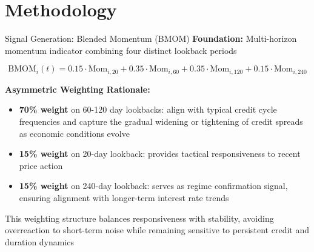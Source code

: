 \documentclass[aspectratio=169,10pt]{beamer}
\begin{document}
\section{Methodology}

\begin{frame}{Signal Generation: Blended Momentum (BMOM)}
\textbf{Foundation:} Multi-horizon momentum indicator combining four distinct lookback periods

\vspace{0.3cm}

$$\text{BMOM}_i(t) = 0.15 \cdot \text{Mom}_{i,20} + 0.35 \cdot \text{Mom}_{i,60} + 0.35 \cdot \text{Mom}_{i,120} + 0.15 \cdot \text{Mom}_{i,240}$$

\vspace{0.3cm}

\textbf{Asymmetric Weighting Rationale:}
\begin{itemize}
    \item \textbf{70\% weight} on 60-120 day lookbacks: align with typical credit cycle frequencies and capture the gradual widening or tightening of credit spreads as economic conditions evolve

    \item \textbf{15\% weight} on 20-day lookback: provides tactical responsiveness to recent price action

    \item \textbf{15\% weight} on 240-day lookback: serves as regime confirmation signal, ensuring alignment with longer-term interest rate trends
\end{itemize}

\vspace{0.2cm}

This weighting structure balances responsiveness with stability, avoiding overreaction to short-term noise while remaining sensitive to persistent credit and duration dynamics
\end{frame}
\end{document}
